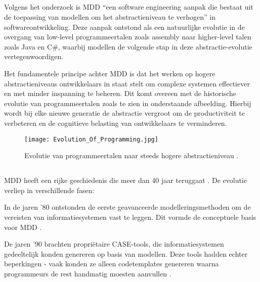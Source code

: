 \subsection{}%

Volgens het onderzoek \textcite{Hailpern2006} is \gls{MDD} “een software engineering aanpak die bestaat uit de toepassing van modellen om het abstractieniveau te verhogen” in softwareontwikkeling. Deze aanpak ontstond als een natuurlijke evolutie in de overgang van low-level programmeertalen zoals assembly naar higher-level talen zoals Java en C\#, waarbij modellen de volgende stap in deze abstractie-evolutie vertegenwoordigen.

Het fundamentele principe achter \gls{MDD} is dat het werken op hogere abstractieniveaus ontwikkelaars in staat stelt om complexe systemen effectiever en met minder inspanning te beheren. Dit komt overeen met de historische evolutie van programmeertalen zoals te zien in onderstaande afbeelding. Hierbij wordt bij elke nieuwe generatie de abstractie vergroot om de productiviteit te verbeteren en de cognitieve belasting van ontwikkelaars te verminderen.

\begin{figure}[H]
    \centering
    \texttt{[image: Evolution\_Of\_Programming.jpg]}
    \caption[Evolution of programming]{\label{fig:evolution} Evolutie van programmeertalen naar steeds hogere abstractieniveau \autocite{Sufi_2023}.}
\end{figure}


\subsection{}%
\gls{MDD} heeft een rijke geschiedenis die meer dan 40 jaar teruggaat \autocite{Henkel2010}. De evolutie verliep in verschillende fasen:

In de jaren '80 ontstonden de eerste geavanceerde modelleringsmethoden om de vereisten van informatiesystemen vast te leggen. Dit vormde de conceptuele basis voor \gls{MDD} \autocite{Henkel2010}.

De jaren '90 brachten propriëtaire \gls{CASE}-tools, die informatiesystemen gedeeltelijk konden genereren op basis van modellen. Deze tools hadden echter beperkingen - vaak konden ze alleen codetemplates genereren waarna programmeurs de rest handmatig moesten aanvullen \autocite{Case_1985}.

